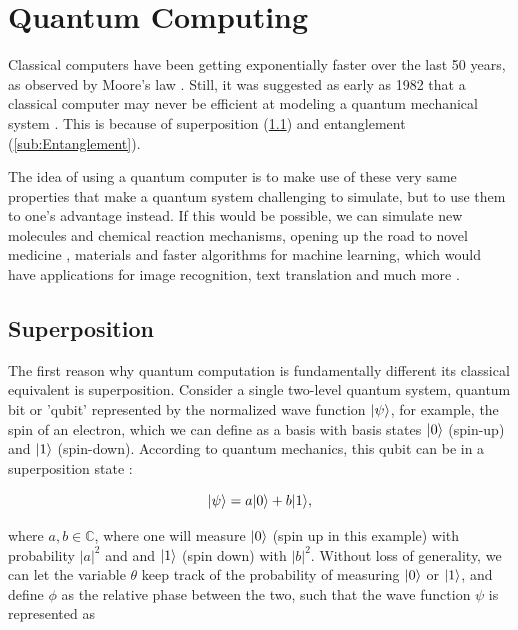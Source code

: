 \section{Quantum Computing}

Classical computers have been getting exponentially faster over the last 50 years, as observed by Moore's law \cite{Moore1965}. 
Still, it was suggested as early as 1982 that a classical computer may never be efficient at modeling a quantum mechanical system \cite{Feynman1982}. 
This is because of superposition (\cref{sub:Superposition}) and entanglement (\cref{sub:Entanglement}). 

The idea of using a quantum computer is to make use of these very same properties that make a quantum system challenging to simulate, but to use them to one's advantage instead. 
If this would be possible, we can simulate new molecules and chemical reaction mechanisms, opening up the road to novel medicine \cite{Robert2021}, materials \cite{Ma2020} and faster algorithms for machine learning, which would have applications for image recognition, text translation and much more \cite{Huang2021}.

\subsection{Superposition}\label{sub:Superposition}

The first reason why quantum computation is fundamentally different its classical equivalent is superposition.
Consider a single two-level quantum system, quantum bit or 'qubit' represented by the normalized wave function $\lvert\psi\rangle$, for example, the spin of an electron, which we can define as a basis with basis states $\lvert0\rangle$ (spin-up) and $\lvert1\rangle$ (spin-down). 
According to quantum mechanics, this qubit can be in a superposition state \cite{Griffiths2004}:

\begin{equation}\label{eq:SuperPositionBasic}
	\lvert\psi\rangle=a\lvert0\rangle+b\lvert1\rangle,
\end{equation}

where $a,b \in \mathbb{C}$, where one will measure $\lvert0\rangle$ (spin up in this example) with probability $|a|^2$ and and $\lvert1\rangle$ (spin down) with $|b|^2$. 
Without loss of generality, we can let the variable $\theta$ keep track of the probability of measuring $\lvert0\rangle$ or $\lvert1\rangle$, and define $\phi$ as the relative phase between the two, such that the wave function $\psi$ is represented as

